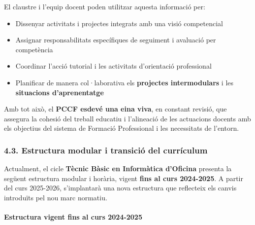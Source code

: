 \documentclass[
  paper=a4,
  ,captions=tableheading
]{scrartcl}
\providecommand{\tightlist}{%
  \setlength{\itemsep}{0pt}\setlength{\parskip}{0pt}}
\begin{document}
El claustre i l'equip docent poden utilitzar aquesta informació per:

\begin{itemize}
\tightlist
\item
  Dissenyar activitats i projectes integrats amb una visió competencial
\item
  Assignar responsabilitats específiques de seguiment i avaluació per
  competència
\item
  Coordinar l'acció tutorial i les activitats d'orientació professional
\item
  Planificar de manera col·laborativa els \textbf{projectes
  intermodulars} i les \textbf{situacions d'aprenentatge}
\end{itemize}

Amb tot això, el \textbf{PCCF esdevé una eina viva}, en constant
revisió, que assegura la cohesió del treball educatiu i l'alineació de
les actuacions docents amb els objectius del sistema de Formació
Professional i les necessitats de l'entorn.

\hypertarget{estructura-modular-i-transiciuxf3-del-curruxedculum}{%
\subsubsection{4.3. Estructura modular i transició del
currículum}\label{estructura-modular-i-transiciuxf3-del-curruxedculum}}

Actualment, el cicle \textbf{Tècnic Bàsic en Informàtica d'Oficina}
presenta la següent estructura modular i horària, vigent \textbf{fins al
curs 2024-2025}. A partir del curs 2025-2026, s'implantarà una nova
estructura que reflecteix els canvis introduïts pel nou marc normatiu.

\hypertarget{estructura-vigent-fins-al-curs-2024-2025}{%
\paragraph{\texorpdfstring{\textbf{Estructura vigent fins al curs
2024-2025}}{Estructura vigent fins al curs 2024-2025}}\label{estructura-vigent-fins-al-curs-2024-2025}}
\end{document}
